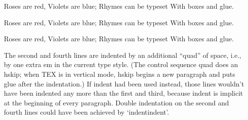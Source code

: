 {\obeylines\smallskip
Roses are red,
\indent Violets are blue;
Rhymes can be typeset
\indent With boxes and glue.
\smallskip}

{\obeylines\smallskip
Roses are red,
\quad Violets are blue;
Rhymes can be typeset
\quad With boxes and glue.
\smallskip}

{\obeylines\smallskip
Roses are red,
\indent\indent  Violets are blue;
Rhymes can be typeset
\indent\indent  With boxes and glue.
\smallskip}

The second and fourth lines are indented by an additional “quad” of space,
i.e., by one extra em in the current type style. (The control sequence quad does an
hskip; when TEX is in vertical mode, hskip begins a new paragraph and puts glue
after the indentation.) If indent had been used instead, those lines wouldn’t have
been indented any more than the first and third, because indent is implicit at the
beginning of every paragraph. Double indentation on the second and fourth lines could
have been achieved by ‘indentindent’.


\bye
